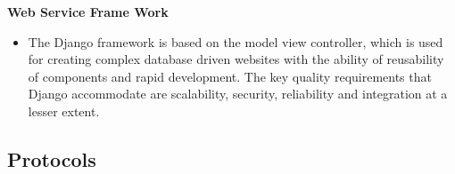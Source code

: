 \documentclass[12pt]{article}
\begin{document}
		\indent\indent \textbf{Web Service Frame Work}
		\begin{itemize}
		\item The Django framework is based on the model view controller, which is used for creating complex database driven websites with the ability of reusability of components and rapid development. 
		The key quality requirements that Django accommodate are scalability, security, reliability and integration at a lesser extent.
		
		\end{itemize}	
		
		\vspace{0.5cm}
	
	\subsection{Protocols}
	
		\vspace{0.5cm}
	
\end{document}

